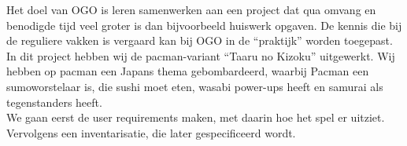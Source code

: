 Het doel van OGO is leren samenwerken aan een project dat qua omvang
en benodigde tijd veel groter is dan bijvoorbeeld huiswerk opgaven.
De kennis die bij de reguliere vakken is vergaard kan bij OGO in de
``praktijk'' worden toegepast. \\

In dit project hebben wij de pacman-variant ``Taaru no Kizoku''
uitgewerkt. Wij hebben op pacman een Japans thema gebombardeerd,
waarbij Pacman een sumoworstelaar is, die sushi moet eten, wasabi
power-ups heeft en samurai als tegenstanders heeft. \\

We gaan eerst de user requirements maken, met daarin hoe het spel er
uitziet. Vervolgens een inventarisatie, die later gespecificeerd
wordt.
